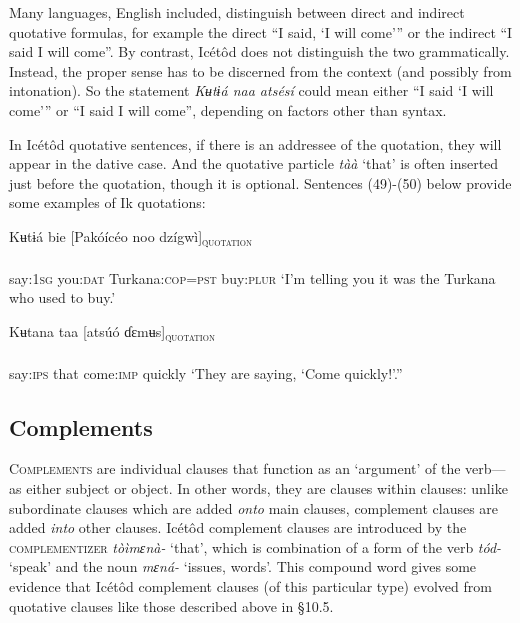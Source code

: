 Many languages, English included, distinguish between direct and indirect quotative formulas, for example the direct “I said, ‘I will come’” or the indirect “I said I will come”. By contrast, Icétôd does not distinguish the two grammatically. Instead, the proper sense has to be discerned from the context (and possibly from intonation). So the statement \textit{Kʉtɨá naa atsésí} could mean either “I said ‘I will come’” or “I said I will come”, depending on factors other than syntax. 

In Icétôd quotative sentences, if there is an addressee of the quotation, they will appear in the dative case. And the quotative particle \textit{tàà} ‘that’ is often inserted just before the quotation, though it is optional. Sentences (49)-(50) below provide some examples of Ik quotations:



\ea\label{ex:}
\gll Kʉtɨá     bie   [Pakóícéo noo   dzígwì]\textsc{\textsubscript{quotation}} \\
    \\
say:\textsc{1sg}   you:\textsc{dat} Turkana:\textsc{cop=pst} buy:\textsc{plur}
\glt ‘I’m telling you it was the Turkana who used to buy.’ 
\z




\ea\label{ex:}
\gll Kʉtana   taa   [atsúó   ɗɛmʉs]\textsc{\textsubscript{quotation}}  \\
    \\
say:\textsc{ips}  that   come:\textsc{imp}   quickly
\glt ‘They are saying, ‘Come quickly!’.” 
\z






\subsection{Complements}


\textsc{Complements} are individual clauses that function as an ‘argument’\textsc{} of the verb—as either subject or object. In other words, they are clauses within clauses: unlike subordinate clauses which are added \textit{onto} main clauses, complement clauses are added \textit{into} other clauses. Icétôd complement clauses are introduced by the \textsc{complementizer} \textit{tòìmɛnà-} ‘that’, which is combination of a form of the verb \textit{tód-} ‘speak’ and the noun \textit{mɛná-} ‘issues, words’. This compound word gives some evidence that Icétôd complement clauses (of this particular type) evolved from quotative clauses like those described above in §10.5.

